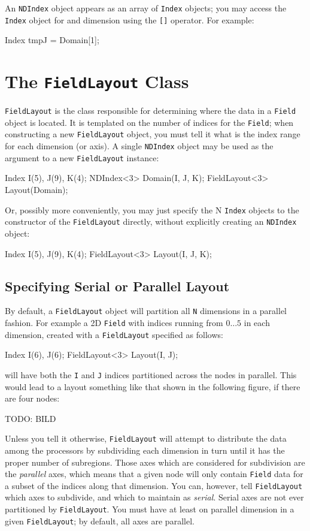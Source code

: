 An \texttt{NDIndex} object appears as an array of \texttt{Index} objects; you may access the \texttt{Index} object for and dimension using the \texttt{[]} operator. For example:
\begin{smallcode}
Index tmpJ = Domain[1];
\end{smallcode}

\section{The \texttt{FieldLayout} Class}

\texttt{FieldLayout} is the class responsible for determining where the data in a \texttt{Field} object is located. It is templated on the number of indices for the \texttt{Field}; when constructing a new \texttt{FieldLayout} object, you must tell it what is the index range for each dimension (or axis). A single \texttt{NDIndex} object may be used as the argument to a new \texttt{FieldLayout} instance:
\begin{smallcode}
Index I(5), J(9), K(4);
NDIndex<3> Domain(I, J, K);
FieldLayout<3> Layout(Domain);
\end{smallcode}
Or, possibly more conveniently, you may just specify the N \texttt{Index} objects to the constructor of the \texttt{FieldLayout} directly, without explicitly creating an \texttt{NDIndex} object:
\begin{smallcode}
Index I(5), J(9), K(4);
FieldLayout<3> Layout(I, J, K);
\end{smallcode}

\subsection{Specifying Serial or Parallel Layout}

By default, a \texttt{FieldLayout} object will partition all \texttt{N} dimensions in a parallel fashion. For example a 2D \texttt{Field} with indices running from $0 \ldots 5$ in each dimension, created with a \texttt{FieldLayout} specified as follows:
\begin{smallcode}
Index I(6), J(6);
FieldLayout<3> Layout(I, J);
\end{smallcode}
will have both the \texttt{I} and \texttt{J} indices partitioned across the nodes in parallel. This would lead to a layout something like that shown in the following figure, if there are four nodes:

TODO: BILD

Unless you tell it otherwise, \texttt{FieldLayout} will attempt to distribute the data among the processors by subdividing each dimension in turn until it has the proper number of subregions. Those axes which are considered for subdivision are the \textit{parallel} axes, which means that a given node will only contain \texttt{Field} data for a subset of the indices along that dimension. You can, however, tell \texttt{FieldLayout} which axes to subdivide, and which to maintain as \textit{serial}. Serial axes are
not ever partitioned by \texttt{FieldLayout}. You must have at least on parallel dimension in a given \texttt{FieldLayout}; by default, all axes are parallel.

